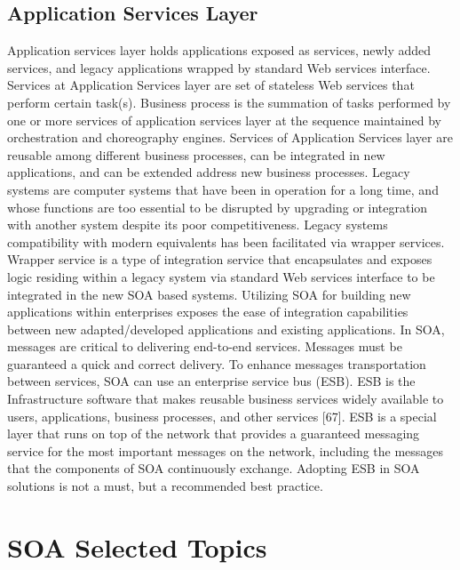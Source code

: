 \documentclass[12pt,a4paper,final,twoside,onecolumn,titlepage]{book}
\begin{document}
\subsection{Application Services Layer}
Application services layer holds applications exposed as services, newly added services, and legacy applications wrapped by standard Web services interface. Services at Application Services layer are set of stateless Web services that perform certain task(s). Business process is the summation of tasks performed by one or more services of application services layer at the sequence maintained by orchestration and choreography engines. Services of Application Services layer are reusable among different business processes, can be integrated in new applications, and can be extended address new business processes.
Legacy systems are computer systems that have been in operation for a long time, and whose functions are too essential to be disrupted by upgrading or integration with another system despite its poor competitiveness. Legacy systems compatibility with modern equivalents has been facilitated via wrapper services. Wrapper service is a type of integration service that encapsulates and exposes logic residing within a legacy system via standard Web services interface to be integrated in the new \gls{SOA} based systems. Utilizing \gls{SOA} for building new applications within enterprises exposes the ease of integration capabilities between new adapted/developed applications and existing applications.
In \gls{SOA}, messages are critical to delivering end-to-end services. Messages must be guaranteed a quick and correct delivery. To enhance messages transportation between services, \gls{SOA} can use an enterprise service bus (ESB). ESB is the Infrastructure software that makes reusable business services widely available to users, applications, business processes, and other services [67]. ESB is a special layer that runs on top of the network that provides a guaranteed messaging service for the most important messages on the network, including the messages that the components of \gls{SOA} continuously exchange. Adopting ESB in \gls{SOA} solutions is not a must, but a recommended best practice.


\section{SOA Selected Topics}
\end{document}
